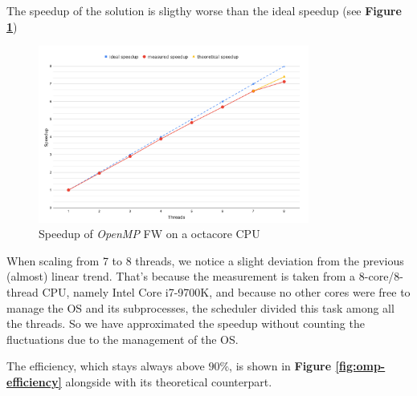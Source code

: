 The speedup of the solution is sligthy worse than the ideal speedup (see \textbf{Figure \ref*{fig:omp-speedup}})

\begin{figure}[h!]
\centering                                                                        
\includegraphics[width=3.5in]{diagrams/openmp-speedup}
\captionsetup{justification=centering,margin=2cm}                                                                                                                                   
\caption{Speedup of \emph{OpenMP} FW on a octacore CPU}                                                                                                                                            
\label{fig:omp-speedup}                                                                                                                                                           
\end{figure}
When scaling from 7 to 8 threads, we notice a slight deviation from the previous (almost) linear trend. That's because the measurement
is taken from a 8-core/8-thread CPU, namely Intel Core i7-9700K, and because no other cores were free to manage the OS and its subprocesses, the scheduler
divided this task among all the threads. So we have approximated the speedup without counting the fluctuations due to the management of the OS. \par

The efficiency, which stays always above $90\%$, is shown in \textbf{Figure \ref*{fig:omp-efficiency}} alongside with its theoretical counterpart.

